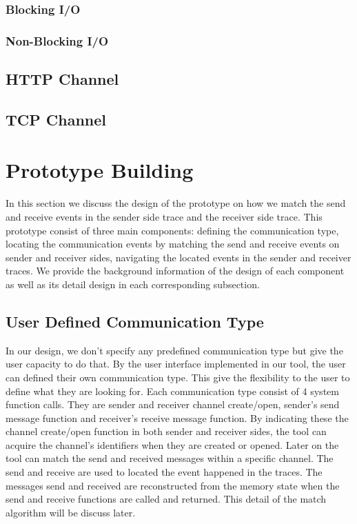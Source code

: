 \documentclass[paper=a4, fontsize=11pt]{scrartcl}
\numberwithin{equation}{section}		%
\numberwithin{figure}{section}			%
\numberwithin{table}{section}				%
\begin{document}
\subsubsection{Blocking I/O}
\subsubsection{Non-Blocking I/O}
\subsection{HTTP Channel}
\subsection{TCP Channel}


\section{Prototype Building}
In this section we discuss the design of the prototype on how we match the send and receive events in the sender side trace and the receiver side trace. This prototype consist of three main components: defining the communication type, locating the communication events by matching the send and receive events on sender and receiver sides, navigating the located events in the sender and receiver traces. We provide the background information of the design of each component as well as its detail design in each corresponding subsection.
\subsection{User Defined Communication Type}
In our design, we don't specify any predefined communication type but give the user capacity to do that. By the user interface implemented in our tool, the user can defined their own communication type. This give the flexibility to the user to define what they are looking for. Each communication type consist of 4 system function calls. They are sender and receiver channel create/open, sender's send message function and receiver's receive message function. By indicating these the channel create/open function in both sender and receiver sides, the tool can acquire the channel's identifiers when they are created or opened. Later on the tool can match the send and received messages within a specific channel. The send and receive are used to located the event happened in the traces. The messages send and received are reconstructed from the memory state when the send and receive functions are called and returned. This detail of the match algorithm will be discuss later.
\end{document}
